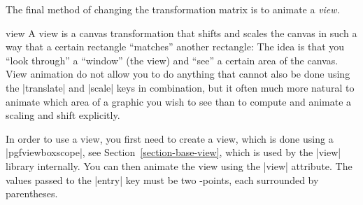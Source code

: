 The final method of changing the transformation matrix is to animate 
a \emph{view.}

\begin{animateattribute}{view}
  A view is a canvas transformation that shifts and
  scales the canvas in such a way that a certain rectangle ``matches''
  another rectangle: The idea is that you ``look through'' a ``window''
  (the view) and ``see'' a certain area of the canvas. View animation do
  not allow you to do anything that cannot also be done using the
  |translate| and |scale| keys in combination, but it often much more
  natural to animate which area of a graphic you wish to see than to
  compute and animate a scaling and shift explicitly.
  
  In order to use a view, you first need to create a view, which is done
  using a |{pgfviewboxscope}|, see Section~\ref{section-base-view},
  which is used by the |view| library internally. You can then animate
  the view using the |view| attribute. The values passed to the |entry|
  key must be two \pgfname-points, each surrounded by parentheses.

  
\begin{codeexample}[animation list={0.5,1,1.5,2},animation bb={(1.1,-0.9) rectangle (2.9,0.9)}]
\end{codeexample}

\begin{codeexample}[width=2cm]
\end{codeexample}
\end{animateattribute}
